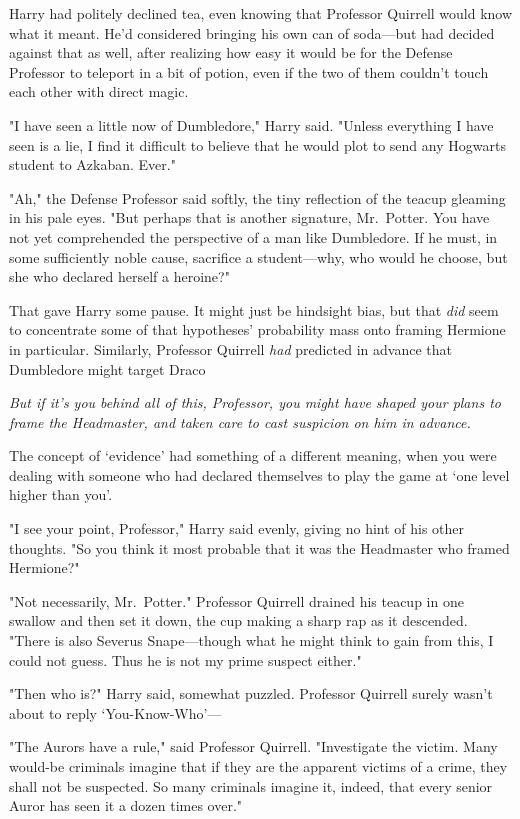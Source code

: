 Harry had politely declined tea, even knowing that Professor Quirrell would
know what it meant. He'd considered bringing his own can of soda---but had
decided against that as well, after realizing how easy it would be for the
Defense Professor to teleport in a bit of potion, even if the two of them
couldn't touch each other with direct magic.

"I have seen a little now of Dumbledore," Harry said. "Unless everything I have
seen is a lie, I find it difficult to believe that he would plot to send any
Hogwarts student to Azkaban. Ever."

"Ah," the Defense Professor said softly, the tiny reflection of the teacup
gleaming in his pale eyes. "But perhaps that is another signature, Mr.~Potter.
You have not yet comprehended the perspective of a man like Dumbledore. If he
must, in some sufficiently noble cause, sacrifice a student---why, who would he
choose, but she who declared herself a heroine?"

That gave Harry some pause. It might just be hindsight bias, but that
\emph{did} seem to concentrate some of that hypotheses' probability mass onto
framing Hermione in particular. Similarly, Professor Quirrell \emph{had}
predicted in advance that Dumbledore might target Draco{\el}

\emph{But if it's you behind all of this, Professor, you might have shaped your
plans to frame the Headmaster, and taken care to cast suspicion on him in
advance.}

The concept of `evidence' had something of a different meaning, when you were
dealing with someone who had declared themselves to play the game at `one level
higher than you'.

"I see your point, Professor," Harry said evenly, giving no hint of his other
thoughts. "So you think it most probable that it was the Headmaster who framed
Hermione?"

"Not necessarily, Mr.~Potter." Professor Quirrell drained his teacup in one
swallow and then set it down, the cup making a sharp rap as it descended.
"There is also Severus Snape---though what he might think to gain from this, I
could not guess. Thus he is not my prime suspect either."

"Then who is?" Harry said, somewhat puzzled. Professor Quirrell surely wasn't
about to reply `You-Know-Who'---

"The Aurors have a rule," said Professor Quirrell. "Investigate the victim.
Many would-be criminals imagine that if they are the apparent victims of a
crime, they shall not be suspected. So many criminals imagine it, indeed, that
every senior Auror has seen it a dozen times over."

